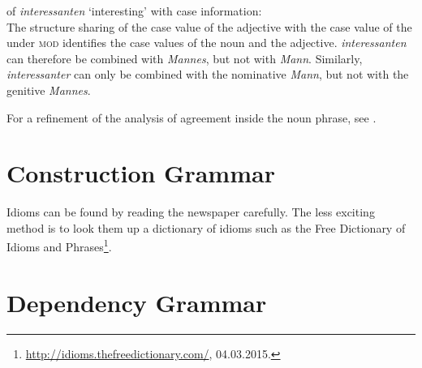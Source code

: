 \begin{enumerate}
\eas
\catv of \emph{interessanten} `interesting' with case information:\\
\zs
The structure sharing of the case value of the adjective with the case value of the \nbar under \textsc{mod}
identifies the case values of the noun and the adjective. \emph{interessanten} can therefore be combined with 
\emph{Mannes}, but not with \emph{Mann}. Similarly, \emph{interessanter}
can only be combined with the nominative \emph{Mann}, but not with the genitive \emph{Mannes}. 

For a refinement of the analysis of agreement inside the noun phrase, see .
\end{enumerate}


\section{Construction Grammar}

Idioms can be found by reading the newspaper carefully. The less exciting method is to look them up a dictionary of
idioms such as the Free Dictionary of Idioms and Phrases\footnote{
\url{http://idioms.thefreedictionary.com/}, 04.03.2015.
}.


\section{Dependency Grammar}

\begin{figure}[H]
\centering
{}
\end{figure}%

\begin{figure}[H]
\centering
{}
\end{figure}%

